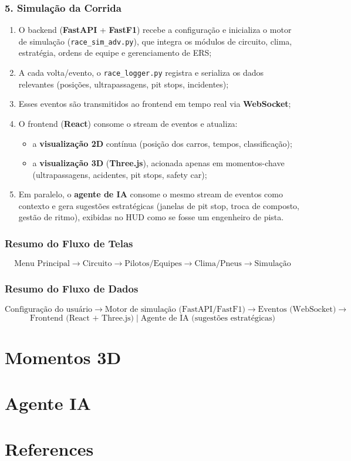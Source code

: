 \documentclass[12pt]{article}
\begin{document}
\subsubsection{5. Simulação da Corrida}
\begin{enumerate}
    \item O backend (\textbf{FastAPI} + \textbf{FastF1}) recebe a configuração e inicializa o motor de simulação (\texttt{race\_sim\_adv.py}), que integra os módulos de circuito, clima, estratégia, ordens de equipe e gerenciamento de ERS;
    \item A cada volta/evento, o \texttt{race\_logger.py} registra e serializa os dados relevantes (posições, ultrapassagens, pit stops, incidentes);
    \item Esses eventos são transmitidos ao frontend em tempo real via \textbf{WebSocket};
    \item O frontend (\textbf{React}) consome o stream de eventos e atualiza:
    \begin{itemize}
        \item a \textbf{visualização 2D} contínua (posição dos carros, tempos, classificação);
        \item a \textbf{visualização 3D} (\textbf{Three.js}), acionada apenas em momentos-chave (ultrapassagens, acidentes, pit stops, safety car);
    \end{itemize}
    \item Em paralelo, o \textbf{agente de IA} consome o mesmo stream de eventos como contexto e gera sugestões estratégicas (janelas de pit stop, troca de composto, gestão de ritmo), exibidas no HUD como se fosse um engenheiro de pista.
\end{enumerate}

\subsubsection{Resumo do Fluxo de Telas}
\[
\text{Menu Principal} \rightarrow \text{Circuito} \rightarrow \text{Pilotos/Equipes} \rightarrow \text{Clima/Pneus} \rightarrow \text{Simulação}
\]

\subsubsection{Resumo do Fluxo de Dados}
\[
\text{Configuração do usuário} \rightarrow \text{Motor de simulação (FastAPI/FastF1)} \rightarrow \text{Eventos (WebSocket)} \rightarrow
\]
\[
\text{Frontend (React + Three.js)} \; \Big| \; \text{Agente de IA (sugestões estratégicas)}
\]
\newpage
\section{Momentos 3D}

\newpage
\section{Agente IA}

\newpage
\section{References}
\printbibliography
\end{document}
